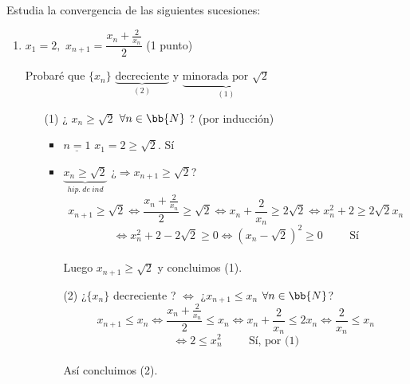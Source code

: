 \documentclass[12pt]{article}
\begin{document}
    \begin{ejercicio}[2 puntos]
        Estudia la convergencia de las siguientes sucesiones:
        \begin{enumerate}
            \item $x_1 = 2,$ $x_{n+1} = \dfrac{x_n+\frac{2}{x_n}}{2}$ (1 punto)

            Probaré que $\{x_n\}$ $\underbrace{\text{decreciente}}_{(2)}$ y $\underbrace{\text{minorada por } \sqrt{2}}_{(1)}$
            \begin{itemize}
                \item [(1)] ¿ $x_n \geq \sqrt{2}$ $\forall n \in \bb{N}$ ? (por inducción)
                \begin{itemize}
                    \item $\underline{n=1}$ $x_1=2 \geq \sqrt{2}$. Sí
                    \item $\underbrace{x_n \geq \sqrt{2}}_{hip.\ de\ ind}$ ¿$\Rightarrow x_{n+1} \geq \sqrt{2}$?
                    \[
                        x_{n+1} \geq \sqrt{2} \Longleftrightarrow \dfrac{x_n+\frac{2}{x_n}}{2} \geq \sqrt{2} \Longleftrightarrow x_n+\dfrac{2}{x_n} \geq 2\sqrt{2} \Longleftrightarrow x_n^2 +2 \geq 2 \sqrt{2}x_n 
                    \]
                    \[
                        \Longleftrightarrow x_n^2 +2 -2\sqrt{2} \geq 0 \Longleftrightarrow (x_n - \sqrt{2})^2 \geq 0 \hspace{1cm} \text{Sí}
                    \]
                    \\
                    Luego $x_{n+1}\geq \sqrt{2}$ y concluimos (1).

                    \item [(2)] ¿$\{x_n\}$ decreciente ? $\Longleftrightarrow$ ¿$x_{n+1} \leq x_n$ $\forall n \in \bb{N}$?
                    \[
                        x_{n+1} \leq x_n \Longleftrightarrow \dfrac{x_n+\frac{2}{x_n}}{2} \leq x_n \Longleftrightarrow x_n + \dfrac{2}{x_n} \leq 2 x_n \Longleftrightarrow \dfrac{2}{x_n} \leq x_n 
                    \]
                    \[
                        \Longleftrightarrow 2 \leq x_n^2 \hspace{1cm} \text{Sí, por (1)}
                    \]
                    \\
                    Así concluimos (2).
                \end{itemize}
            \end{itemize}


\end{enumerate}
\end{ejercicio}
\end{document}
